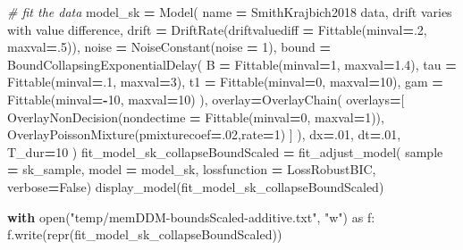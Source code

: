 \documentclass[
]{book}
\newenvironment{Shaded}{\begin{snugshade}}{\end{snugshade}}
\newcommand{\BuiltInTok}[1]{#1}
\newcommand{\CommentTok}[1]{\textcolor[rgb]{0.56,0.35,0.01}{\textit{#1}}}
\newcommand{\ControlFlowTok}[1]{\textcolor[rgb]{0.13,0.29,0.53}{\textbf{#1}}}
\newcommand{\DecValTok}[1]{\textcolor[rgb]{0.00,0.00,0.81}{#1}}
\newcommand{\FloatTok}[1]{\textcolor[rgb]{0.00,0.00,0.81}{#1}}
\newcommand{\ImportTok}[1]{#1}
\newcommand{\NormalTok}[1]{#1}
\newcommand{\OperatorTok}[1]{\textcolor[rgb]{0.81,0.36,0.00}{\textbf{#1}}}
\newcommand{\StringTok}[1]{\textcolor[rgb]{0.31,0.60,0.02}{#1}}
\newcommand{\VariableTok}[1]{\textcolor[rgb]{0.00,0.00,0.00}{#1}}
\begin{document}
\begin{Shaded}
\begin{Highlighting}[]
\CommentTok{\# fit the data}
\NormalTok{model\_sk }\OperatorTok{=}\NormalTok{ Model(}
\NormalTok{  name }\OperatorTok{=} \StringTok{\textquotesingle{}SmithKrajbich2018 data, drift varies with value difference\textquotesingle{}}\NormalTok{,}
\NormalTok{  drift }\OperatorTok{=}\NormalTok{ DriftRate(driftvaluediff }\OperatorTok{=}\NormalTok{ Fittable(minval}\OperatorTok{=}\FloatTok{.2}\NormalTok{, maxval}\OperatorTok{=}\FloatTok{.5}\NormalTok{)),}
\NormalTok{  noise }\OperatorTok{=}\NormalTok{ NoiseConstant(noise }\OperatorTok{=} \DecValTok{1}\NormalTok{),}
\NormalTok{  bound }\OperatorTok{=}\NormalTok{ BoundCollapsingExponentialDelay(}
\NormalTok{    B }\OperatorTok{=}\NormalTok{ Fittable(minval}\OperatorTok{=}\DecValTok{1}\NormalTok{, maxval}\OperatorTok{=}\FloatTok{1.4}\NormalTok{),}
\NormalTok{    tau }\OperatorTok{=}\NormalTok{ Fittable(minval}\OperatorTok{=}\FloatTok{.1}\NormalTok{, maxval}\OperatorTok{=}\DecValTok{3}\NormalTok{),}
\NormalTok{    t1 }\OperatorTok{=}\NormalTok{ Fittable(minval}\OperatorTok{=}\DecValTok{0}\NormalTok{, maxval}\OperatorTok{=}\DecValTok{10}\NormalTok{),}
\NormalTok{    gam }\OperatorTok{=}\NormalTok{ Fittable(minval}\OperatorTok{={-}}\DecValTok{10}\NormalTok{, maxval}\OperatorTok{=}\DecValTok{10}\NormalTok{)}
\NormalTok{  ),}
\NormalTok{  overlay}\OperatorTok{=}\NormalTok{OverlayChain(}
\NormalTok{    overlays}\OperatorTok{=}\NormalTok{[}
\NormalTok{      OverlayNonDecision(nondectime }\OperatorTok{=}\NormalTok{ Fittable(minval}\OperatorTok{=}\DecValTok{0}\NormalTok{, maxval}\OperatorTok{=}\DecValTok{1}\NormalTok{)), }
\NormalTok{      OverlayPoissonMixture(pmixturecoef}\OperatorTok{=}\FloatTok{.02}\NormalTok{,rate}\OperatorTok{=}\DecValTok{1}\NormalTok{)}
\NormalTok{    ]}
\NormalTok{  ),}
\NormalTok{  dx}\OperatorTok{=}\FloatTok{.01}\NormalTok{, }
\NormalTok{  dt}\OperatorTok{=}\FloatTok{.01}\NormalTok{, }
\NormalTok{  T\_dur}\OperatorTok{=}\DecValTok{10}
\NormalTok{)}
\NormalTok{fit\_model\_sk\_collapseBoundScaled }\OperatorTok{=}\NormalTok{ fit\_adjust\_model(}
\NormalTok{  sample }\OperatorTok{=}\NormalTok{ sk\_sample, }
\NormalTok{  model }\OperatorTok{=}\NormalTok{ model\_sk,}
\NormalTok{  lossfunction }\OperatorTok{=}\NormalTok{ LossRobustBIC,}
\NormalTok{  verbose}\OperatorTok{=}\VariableTok{False}\NormalTok{)}
\NormalTok{display\_model(fit\_model\_sk\_collapseBoundScaled)}

\ControlFlowTok{with} \BuiltInTok{open}\NormalTok{(}\StringTok{"temp/memDDM{-}boundsScaled{-}additive.txt"}\NormalTok{, }\StringTok{"w"}\NormalTok{) }\ImportTok{as}\NormalTok{ f:}
\NormalTok{    f.write(}\BuiltInTok{repr}\NormalTok{(fit\_model\_sk\_collapseBoundScaled))}
\end{Highlighting}
\end{Shaded}
\end{document}
